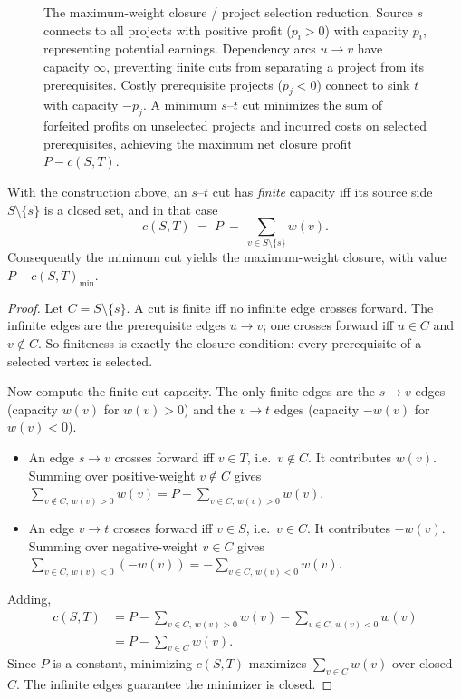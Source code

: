 \begin{figure}[H]
\caption{The maximum-weight closure / project selection reduction. Source $s$ connects
to all projects with positive profit ($p_i > 0$) with capacity $p_i$, representing
potential earnings. Dependency arcs $u \to v$ have capacity $\infty$, preventing
finite cuts from separating a project from its prerequisites. Costly prerequisite
projects ($p_j < 0$) connect to sink $t$ with capacity $-p_j$. A minimum $s$--$t$
cut minimizes the sum of forfeited profits on unselected projects and incurred costs
on selected prerequisites, achieving the maximum net closure profit $P - c(S,T)$.}
\label{ch18:fig-closure-reduction}
\end{figure}

\begin{theorem}
\label{ch18:thm-closure}
With the construction above, an $s$--$t$ cut has \emph{finite} capacity iff its source side $S\setminus\{s\}$ is a closed set, and in that case
\[
  c(S,T) \;=\; P \;-\; \sum_{v\in S\setminus\{s\}} w(v).
\]
Consequently the minimum cut yields the maximum-weight closure, with value $P - c(S,T)_{\min}$.
\end{theorem}

\begin{proof}
Let $C = S\setminus\{s\}$. A cut is finite iff no infinite edge crosses forward. The infinite edges are the prerequisite edges $u\to v$; one crosses forward iff $u\in C$ and $v\notin C$. So finiteness is exactly the closure condition: every prerequisite of a selected vertex is selected.

Now compute the finite cut capacity. The only finite edges are the $s\to v$ edges (capacity $w(v)$ for $w(v)>0$) and the $v\to t$ edges (capacity $-w(v)$ for $w(v)<0$).
\begin{itemize}
\item An edge $s\to v$ crosses forward iff $v\in T$, i.e.\ $v\notin C$. It contributes $w(v)$. Summing over positive-weight $v\notin C$ gives $\sum_{v\notin C,\, w(v)>0} w(v) = P - \sum_{v\in C,\, w(v)>0} w(v)$.
\item An edge $v\to t$ crosses forward iff $v\in S$, i.e.\ $v\in C$. It contributes $-w(v)$. Summing over negative-weight $v\in C$ gives $\sum_{v\in C,\, w(v)<0} (-w(v)) = -\sum_{v\in C,\,w(v)<0} w(v)$.
\end{itemize}
Adding,
\begin{align*}
  c(S,T) &= P - \sum_{v\in C,\, w(v)>0} w(v) - \sum_{v\in C,\, w(v)<0} w(v) \\
         &= P - \sum_{v\in C} w(v).
\end{align*}
Since $P$ is a constant, minimizing $c(S,T)$ maximizes $\sum_{v\in C} w(v)$ over closed $C$. The infinite edges guarantee the minimizer is closed.
\end{proof}

